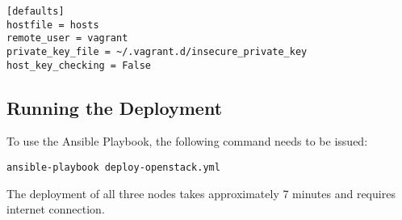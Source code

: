 \begin{lstlisting}
[defaults]
hostfile = hosts
remote_user = vagrant
private_key_file = ~/.vagrant.d/insecure_private_key
host_key_checking = False
\end{lstlisting}

\subsection{Running the Deployment}

To use the Ansible Playbook, the following command needs to be issued:

\begin{lstlisting}
ansible-playbook deploy-openstack.yml
\end{lstlisting}

The deployment of all three nodes takes approximately 7 minutes and requires internet connection.
